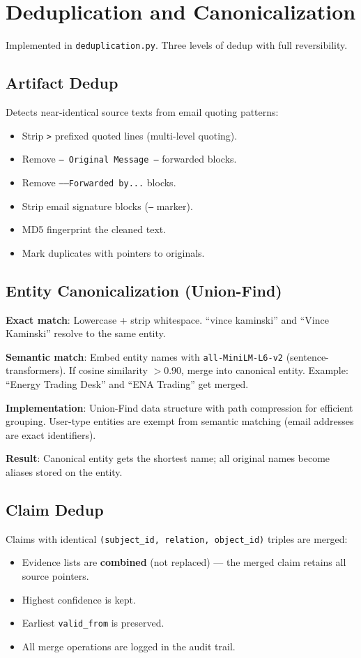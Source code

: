 \documentclass[11pt,a4paper]{article}
\begin{document}
\section{Deduplication and Canonicalization}

Implemented in \texttt{deduplication.py}. Three levels of dedup with full reversibility.

\subsection{Artifact Dedup}
Detects near-identical source texts from email quoting patterns:
\begin{itemize}[nosep]
    \item Strip \texttt{>} prefixed quoted lines (multi-level quoting).
    \item Remove \texttt{--- Original Message ---} forwarded blocks.
    \item Remove \texttt{-----Forwarded by...} blocks.
    \item Strip email signature blocks (\texttt{--} marker).
    \item MD5 fingerprint the cleaned text.
    \item Mark duplicates with pointers to originals.
\end{itemize}

\subsection{Entity Canonicalization (Union-Find)}
\textbf{Exact match}: Lowercase + strip whitespace. ``vince kaminski'' and ``Vince Kaminski'' resolve to the same entity.

\textbf{Semantic match}: Embed entity names with \texttt{all-MiniLM-L6-v2} (sentence-transformers). If cosine similarity $> 0.90$, merge into canonical entity. Example: ``Energy Trading Desk'' and ``ENA Trading'' get merged.

\textbf{Implementation}: Union-Find data structure with path compression for efficient grouping. User-type entities are exempt from semantic matching (email addresses are exact identifiers).

\textbf{Result}: Canonical entity gets the shortest name; all original names become aliases stored on the entity.

\subsection{Claim Dedup}
Claims with identical \texttt{(subject\_id, relation, object\_id)} triples are merged:
\begin{itemize}[nosep]
    \item Evidence lists are \textbf{combined} (not replaced) --- the merged claim retains all source pointers.
    \item Highest confidence is kept.
    \item Earliest \texttt{valid\_from} is preserved.
    \item All merge operations are logged in the audit trail.
\end{itemize}
\end{document}
